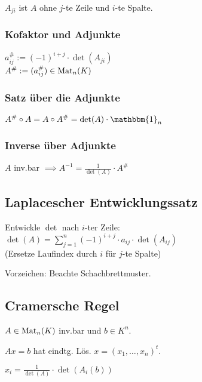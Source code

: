 $A_{ji}$ ist $A$ ohne $j$-te Zeile und $i$-te Spalte.

\subsubsection*{Kofaktor und Adjunkte}
$a^\#_{ij} := (-1)^{i+j}\cdot\det(A_{ji})$ \\
$A^\# := (a^\#_{ij})\in\operatorname{Mat}_n(K)$

\subsubsection*{Satz über die Adjunkte}
$A^\# \circ A = A \circ A^\# = \det(A) \cdot \mathbbm{1}_n$

\subsubsection*{Inverse über Adjunkte}
$A$ inv.bar $\displaystyle \implies A^{-1}=\frac{1}{\det(A)}\cdot A^\#$

\subsection*{Laplacescher Entwicklungssatz}
Entwickle $\det$ nach $i$-ter Zeile: \\
$\displaystyle \det(A)=\sum_{j=1}^n(-1)^{i+j}\cdot a_{ij} \cdot \det(A_{ij})$ \\
(Ersetze Laufindex durch $i$ für $j$-te Spalte)

Vorzeichen: Beachte Schachbrettmuster.

\subsection*{Cramersche Regel}
$A\in\operatorname{Mat}_n(K)$ inv.bar und $b\in K^n$.

$Ax=b$ hat eindtg. Lös. $x=(x_1,\dots,x_n)^t$.

$x_i = \frac{1}{\det(A)}\cdot\det(A_i(b))$
